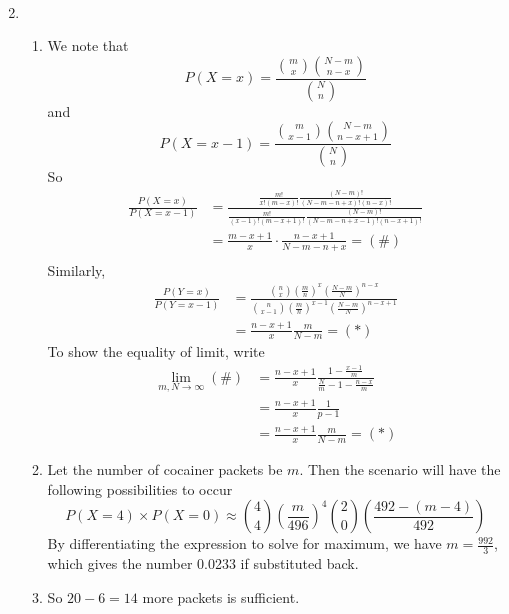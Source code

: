 \documentclass[12pt]{article}
\theoremstyle{definition}
\begin{document}
\begin{enumerate}
\begin{enumerate}
\begin{align*}
\end{align*}
\end{enumerate}
\item \begin{enumerate}
  \item We note that
  \[
P(X=x)=\frac{\binom{m}{x}\binom{N-m}{n-x}}{\binom{N}{n}}
  \]
  and
  \[
P(X=x-1)=\frac{\binom{m}{x-1}\binom{N-m}{n-x+1}}{\binom{N}{n}}
  \]
  So
  \begin{align*}
\frac{P(X=x)}{P(X=x-1)}&=\frac{\frac{m!}{x!(m-x)!}\frac{(N-m)!}{(N-m-n+x)!(n-x)!}}{\frac{m!}{(x-1)!(m-x+1)!}\frac{(N-m)!}{(N-m-n+x-1)!(n-x+1)!}}\\
&=\frac{m-x+1}{x}\cdot\frac{n-x+1}{N-m-n+x}=(\#)\\
  \end{align*}
  Similarly,
  \begin{align*}
\frac{P(Y=x)}{P(Y=x-1)}&=\frac{\binom{n}{x}\left(\frac{m}{n}\right)^x\left(\frac{N-m}{N}\right)^{n-x}}{\binom{n}{x-1}\left(\frac{m}{n}\right)^{x-1}\left(\frac{N-m}{N}\right)^{n-x+1}}\\
&=\frac{n-x+1}{x}\frac{m}{N-m}=(*)
  \end{align*}
  To show the equality of limit, write
  \begin{align*}
\lim_{m,N\to\infty}(\#)&=\frac{n-x+1}{x}\frac{1-\frac{x-1}{m}}{\frac{N}{m}-1-\frac{n-x}{m}}\\&=\frac{n-x+1}{x}\frac{1}{p-1}\\&=\frac{n-x+1}{x}\frac{m}{N-m}=(*)
  \end{align*}
  \item Let the number of cocainer packets be $m$. Then the scenario will have the following possibilities to occur
  \[
P(X=4)\times P(X=0)\approx\binom{4}{4}\left(\frac{m}{496}\right)^4\binom{2}{0}\left(\frac{492-(m-4)}{492}\right)
  \]
  By differentiating the expression to solve for maximum, we have $m=\frac{992}{3}$, which gives the number 0.0233 if substituted back.
  \item So $20-6 = 14$ more packets is sufficient. 
\end{enumerate}
\end{enumerate}
\end{document}

